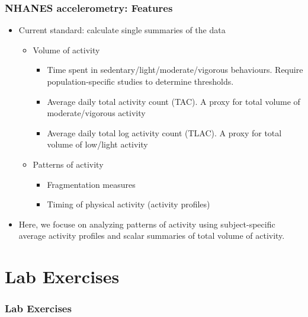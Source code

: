\documentclass[10pt]{beamer}\usepackage[]{graphicx}\usepackage[]{color}
\begin{document}
\begin{frame}
\frametitle{NHANES accelerometry: Features}
\begin{itemize}
\item Current standard: calculate single summaries of the data
    \begin{itemize}
    \item Volume of activity\footnotemark
        \begin{itemize}
        \item Time spent in sedentary/light/moderate/vigorous behaviours. Require population-specific studies to determine thresholds.
        \item Average daily total activity count (TAC). A proxy for total volume of moderate/vigorous activity
        \item Average daily total log activity count (TLAC). A proxy for total volume of low/light activity
        \end{itemize}
    \item Patterns of activity
        \begin{itemize}
        \item Fragmentation measures\footnotemark
        \item Timing of physical activity (activity profiles)
        \end{itemize}
    \end{itemize}
\item Here, we focuse on analyzing patterns of activity using subject-specific average activity profiles and scalar summaries of total volume of activity. 
\end{itemize}


\end{frame}




\subsection{}


















\section{Lab Exercises}

\begin{frame}
\frametitle{Lab Exercises}

\end{frame}
\end{document}
